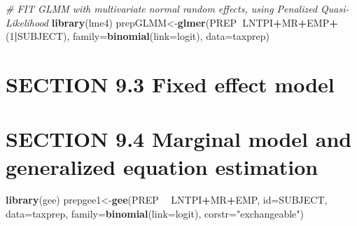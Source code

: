 \documentclass[]{book}
\newenvironment{Shaded}{\begin{snugshade}}{\end{snugshade}}
\newcommand{\CommentTok}[1]{\textcolor[rgb]{0.56,0.35,0.01}{\textit{#1}}}
\newcommand{\DataTypeTok}[1]{\textcolor[rgb]{0.13,0.29,0.53}{#1}}
\newcommand{\DecValTok}[1]{\textcolor[rgb]{0.00,0.00,0.81}{#1}}
\newcommand{\KeywordTok}[1]{\textcolor[rgb]{0.13,0.29,0.53}{\textbf{#1}}}
\newcommand{\NormalTok}[1]{#1}
\newcommand{\OperatorTok}[1]{\textcolor[rgb]{0.81,0.36,0.00}{\textbf{#1}}}
\newcommand{\StringTok}[1]{\textcolor[rgb]{0.31,0.60,0.02}{#1}}
\begin{document}
\begin{Shaded}
\begin{Highlighting}[]
\CommentTok{# FIT GLMM with multivariate normal random effects, using Penalized Quasi-Likelihood}
\KeywordTok{library}\NormalTok{(lme4)}
\NormalTok{prepGLMM<-}\KeywordTok{glmer}\NormalTok{(PREP}\OperatorTok{~}\NormalTok{LNTPI}\OperatorTok{+}\NormalTok{MR}\OperatorTok{+}\NormalTok{EMP}\OperatorTok{+}\StringTok{ }\NormalTok{(}\DecValTok{1}\OperatorTok{|}\NormalTok{SUBJECT), }\DataTypeTok{family=}\KeywordTok{binomial}\NormalTok{(}\DataTypeTok{link=}\NormalTok{logit), }\DataTypeTok{data=}\NormalTok{taxprep)}
\end{Highlighting}
\end{Shaded}

\hypertarget{section-9.3-fixed-effect-model}{%
\section{SECTION 9.3 Fixed effect model}\label{section-9.3-fixed-effect-model}}

\begin{Shaded}
\end{Shaded}

\hypertarget{section-9.4-marginal-model-and-generalized-equation-estimation}{%
\section{SECTION 9.4 Marginal model and generalized equation estimation}\label{section-9.4-marginal-model-and-generalized-equation-estimation}}

\begin{Shaded}
\begin{Highlighting}[]
\KeywordTok{library}\NormalTok{(gee)}
\NormalTok{prepgee1<-}\KeywordTok{gee}\NormalTok{(PREP }\OperatorTok{~}\StringTok{ }\NormalTok{LNTPI}\OperatorTok{+}\NormalTok{MR}\OperatorTok{+}\NormalTok{EMP, }\DataTypeTok{id=}\NormalTok{SUBJECT, }\DataTypeTok{data=}\NormalTok{taxprep, }\DataTypeTok{family=}\KeywordTok{binomial}\NormalTok{(}\DataTypeTok{link=}\NormalTok{logit), }\DataTypeTok{corstr=}\StringTok{"exchangeable"}\NormalTok{) }
\end{Highlighting}
\end{Shaded}
\end{document}
